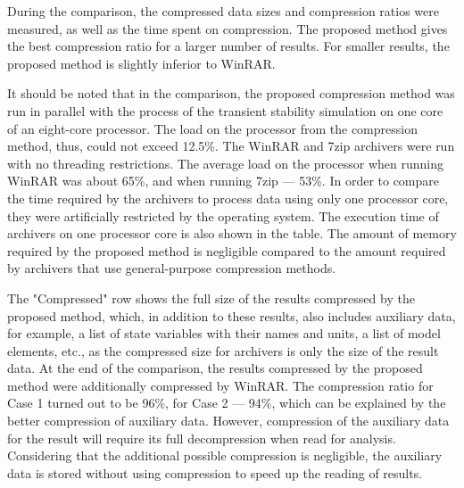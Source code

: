 \documentclass[conference]{IEEEtran}
\begin{document}
During the comparison, the compressed data sizes and compression ratios were measured, as well as the time spent on compression.
The proposed method gives the best compression ratio for a larger number of results. For smaller results, the proposed method is slightly inferior to WinRAR.

It should be noted that in the comparison, the proposed compression method was run in parallel with the process 
of  the transient stability simulation on one core of an eight-core processor. 
The load on the processor from the compression method, thus, could not exceed 12.5\%. 
The WinRAR and 7zip archivers were run with no threading restrictions. 
The average load on the processor when running WinRAR was about 65\%, and when running 7zip --- 53\%. 
In order to compare the time required by the archivers to process data using only one processor core, they 
were artificially restricted by the operating system. The execution time of archivers on one 
processor core is also shown in the table. The amount of memory required by the proposed method is negligible 
compared to the amount required by archivers that use general-purpose compression methods.

The "Compressed" row shows the full size of the results compressed by the proposed method, which, 
in addition to these results, also includes auxiliary data, for example, a list of state 
variables with their names and units, a list of model elements, etc., as the compressed size for archivers 
is only the size of the result data. At the end of the comparison, the results compressed 
by the proposed method were additionally compressed by WinRAR. The compression ratio for Case 1 turned out 
to be 96\%, for Case 2 --- 94\%, which can be explained by the better compression of auxiliary data. 
However, compression of the auxiliary data for the result will require 
its full decompression when read for analysis. Considering that the additional possible compression is negligible, the auxiliary data is stored without using compression to speed up the reading of results.
\end{document}
